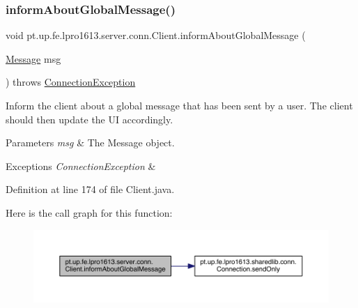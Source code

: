 \subsubsection{\texorpdfstring{inform\+About\+Global\+Message()}{informAboutGlobalMessage()}}
{\footnotesize\ttfamily void pt.\+up.\+fe.\+lpro1613.\+server.\+conn.\+Client.\+inform\+About\+Global\+Message (\begin{DoxyParamCaption}\item[{\hyperlink{classpt_1_1up_1_1fe_1_1lpro1613_1_1sharedlib_1_1structs_1_1_message}{Message}}]{msg }\end{DoxyParamCaption}) throws \hyperlink{classpt_1_1up_1_1fe_1_1lpro1613_1_1sharedlib_1_1exceptions_1_1_connection_exception}{Connection\+Exception}}

Inform the client about a global message that has been sent by a user. The client should then update the UI accordingly.


\begin{DoxyParams}{Parameters}
{\em msg} & The Message object. \\
\hline
\end{DoxyParams}

\begin{DoxyExceptions}{Exceptions}
{\em Connection\+Exception} & \\
\hline
\end{DoxyExceptions}


Definition at line 174 of file Client.\+java.

Here is the call graph for this function\+:
\nopagebreak
\begin{figure}[H]
\begin{center}
\leavevmode
\includegraphics[width=350pt]{classpt_1_1up_1_1fe_1_1lpro1613_1_1server_1_1conn_1_1_client_aea2e952268afe16993958c8affb921cb_cgraph}
\end{center}
\end{figure}
\hypertarget{classpt_1_1up_1_1fe_1_1lpro1613_1_1server_1_1conn_1_1_client_a2d18ebb9809e36b016e9db24c8274522}{}\label{classpt_1_1up_1_1fe_1_1lpro1613_1_1server_1_1conn_1_1_client_a2d18ebb9809e36b016e9db24c8274522} 

